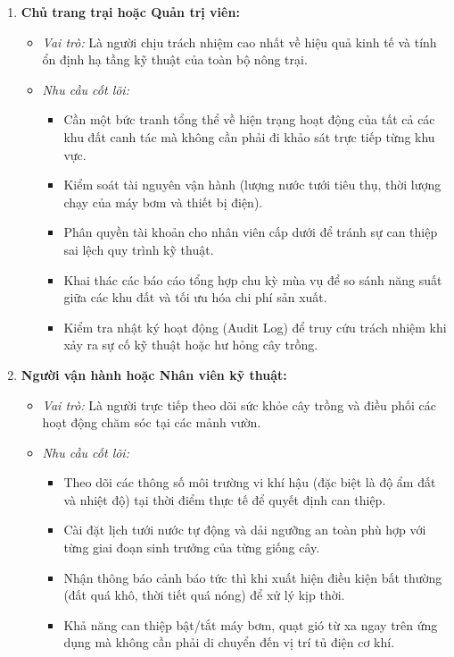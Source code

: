 \begin{enumerate}[leftmargin=*]
    \item \textbf{Chủ trang trại hoặc Quản trị viên:}
    \begin{itemize}
        \item \textit{Vai trò:} Là người chịu trách nhiệm cao nhất về hiệu quả kinh tế và tính ổn định hạ tầng kỹ thuật của toàn bộ nông trại.
        \item \textit{Nhu cầu cốt lõi:} 
        \begin{itemize}
            \item Cần một bức tranh tổng thể về hiện trạng hoạt động của tất cả các khu đất canh tác mà không cần phải đi khảo sát trực tiếp từng khu vực.
            \item Kiểm soát tài nguyên vận hành (lượng nước tưới tiêu thụ, thời lượng chạy của máy bơm và thiết bị điện).
            \item Phân quyền tài khoản cho nhân viên cấp dưới để tránh sự can thiệp sai lệch quy trình kỹ thuật.
            \item Khai thác các báo cáo tổng hợp chu kỳ mùa vụ để so sánh năng suất giữa các khu đất và tối ưu hóa chi phí sản xuất.
            \item Kiểm tra nhật ký hoạt động (Audit Log) để truy cứu trách nhiệm khi xảy ra sự cố kỹ thuật hoặc hư hỏng cây trồng.
        \end{itemize}
    \end{itemize}

    \item \textbf{Người vận hành hoặc Nhân viên kỹ thuật:}
    \begin{itemize}
        \item \textit{Vai trò:} Là người trực tiếp theo dõi sức khỏe cây trồng và điều phối các hoạt động chăm sóc tại các mảnh vườn.
        \item \textit{Nhu cầu cốt lõi:}
        \begin{itemize}
            \item Theo dõi các thông số môi trường vi khí hậu (đặc biệt là độ ẩm đất và nhiệt độ) tại thời điểm thực tế để quyết định can thiệp.
            \item Cài đặt lịch tưới nước tự động và dải ngưỡng an toàn phù hợp với từng giai đoạn sinh trưởng của từng giống cây.
            \item Nhận thông báo cảnh báo tức thì khi xuất hiện điều kiện bất thường (đất quá khô, thời tiết quá nóng) để xử lý kịp thời.
            \item Khả năng can thiệp bật/tắt máy bơm, quạt gió từ xa ngay trên ứng dụng mà không cần phải di chuyển đến vị trí tủ điện cơ khí.
        \end{itemize}
    \end{itemize}
\end{enumerate}

